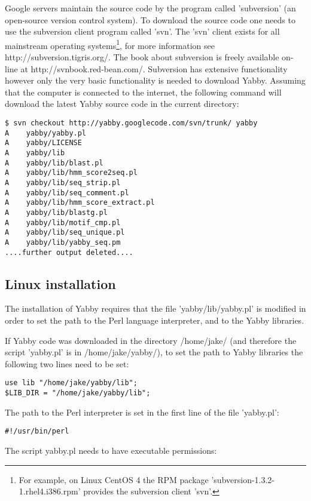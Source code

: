 Google servers maintain the source code by the program called 'subversion'
(an open-source version control system).  To download the source code
one needs to use the subversion client program called 'svn'.  The 'svn'
client exists for all mainstream operating systems\footnote{For example,
on Linux CentOS 4 the RPM package 'subversion-1.3.2-1.rhel4.i386.rpm'
provides the subversion client 'svn'.}, for more information see
http://subversion.tigris.org/.  The book about subversion is freely
available on-line at http://svnbook.red-bean.com/. Subversion has
extensive functionality however only the very basic functionality
is needed to download Yabby.  Assuming that the computer is connected
to the internet, the following command will download the latest Yabby 
source code in the current directory:

\begin{verbatim}
$ svn checkout http://yabby.googlecode.com/svn/trunk/ yabby
A    yabby/yabby.pl
A    yabby/LICENSE
A    yabby/lib
A    yabby/lib/blast.pl
A    yabby/lib/hmm_score2seq.pl
A    yabby/lib/seq_strip.pl
A    yabby/lib/seq_comment.pl
A    yabby/lib/hmm_score_extract.pl
A    yabby/lib/blastg.pl
A    yabby/lib/motif_cmp.pl
A    yabby/lib/seq_unique.pl
A    yabby/lib/yabby_seq.pm
....further output deleted....
\end{verbatim}

\subsection{Linux installation}

The installation of Yabby requires that the file 'yabby/lib/yabby.pl' is
modified in order to set the path to the Perl language interpreter,
and to the Yabby libraries.

If Yabby code was downloaded in the directory /home/jake/ (and
therefore the script 'yabby.pl' is in /home/jake/yabby/), to set
the path to Yabby libraries the following two lines need to be
set: 

\begin{verbatim}
use lib "/home/jake/yabby/lib";
$LIB_DIR = "/home/jake/yabby/lib";
\end{verbatim}

The path to the Perl interpreter is set in the first line of the
file 'yabby.pl':

\begin{verbatim}
#!/usr/bin/perl
\end{verbatim}

The script yabby.pl needs to have executable permissions:

